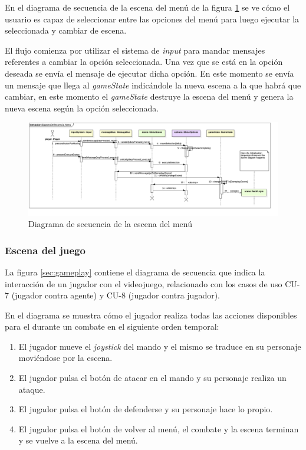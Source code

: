 En el diagrama de secuencia de la escena del menú de la figura \ref{sec:menu} se ve cómo el usuario es capaz de seleccionar entre las opciones del menú para luego ejecutar la seleccionada y cambiar de escena.

\bigskip

El flujo comienza por utilizar el sistema de \textit{input} para mandar mensajes referentes a cambiar la opción seleccionada. Una vez que se está en la opción deseada se envía el mensaje de ejecutar dicha opción. En este momento se envía un mensaje que llega al \textit{gameState} indicándole la nueva escena a la que habrá que cambiar, en este momento el \textit{gameState} destruye la escena del menú y genera la nueva escena según la opción seleccionada.

\begin{landscape}
\begin{figure}
	\hspace*{-3cm}  
	\includegraphics[width=24cm]{otros/UML/png/alld/png/CasosDeUso__Especifico__Collaboration1__Interaction1__diagramaDeSecuencia_Menu_17.png}
	\caption{Diagrama de secuencia de la escena del menú}
	\label{sec:menu}
\end{figure}
\end{landscape}

\subsubsection*{Escena del juego}

La figura \ref{sec:gameplay} contiene el diagrama de secuencia que indica la interacción de un jugador con el videojuego, relacionado con los casos de uso CU-7 (jugador contra agente) y CU-8 (jugador contra jugador).

\bigskip

En el diagrama se muestra cómo el jugador realiza todas las acciones disponibles para el durante un combate en el siguiente orden temporal:

\begin{enumerate}
	\item El jugador mueve el \textit{joystick} del mando y el mismo se traduce en su personaje moviéndose por la escena.
	\item El jugador pulsa el botón de atacar en el mando y su personaje realiza un ataque.
	\item El jugador pulsa el botón de defenderse y su personaje hace lo propio.
	\item El jugador pulsa el botón de volver al menú, el combate y la escena terminan y se vuelve a la escena del menú.
\end{enumerate}

